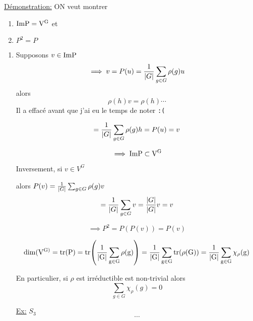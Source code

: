 \underline{Démonstration:} ON veut montrer 

\begin{enumerate}
	\item $\rm{Im} P = V^{G}$ et 
	\item $P^{2}= P$
\end{enumerate}

\begin{enumerate}
	\item Supposons $v \in \rm{Im} P $
		\[ \implies v = P(u) = \frac{1}{\abs{G}} \sum_{g\in G} \rho(g) u  \]
		alors \[ \rho(h) v = \rho (h) \dotsb  \]
		Il a effacé avant que j'ai eu le temps de noter \verb|:(|

\[  = \frac{1}{\abs{G}} \sum_{g\in G} \rho(g) h = P(u) = v  \]

\[ \implies \rm{Im} P \subset V^{G} \]

Inversement, si $v \in V^G$

alors $P(v) = \frac{1}{\abs{G}} \sum_{g \in G} \rho(g) v  $
\[ = \frac{1}{\abs{G}} \sum_{g\in G} v = \frac{\abs{G}}{\abs{G}} v = v    \]

\[ \implies P^{2}= P(P(v)) = P(v) \]

\[ \rm{dim}(V^{G)}= \tr(P) = \tr(\frac{1}{\abs{G}} \sum_{g \in G} \rho(g) ) = \frac{1}{\abs{G}} \sum_{g \in G} \tr(\rho(G))  =\frac{1}{\abs{G}} \sum_{g \in G} \chi_{\rho} (g)  \]

En particulier, si $\rho$ est irréductible est non-trivial alors \[ \sum_{g \in G} \chi_{\rho} (g) = 0 \]

\underline{Ex:} $S_3$
\[ \dotsb \]

\end{enumerate}







